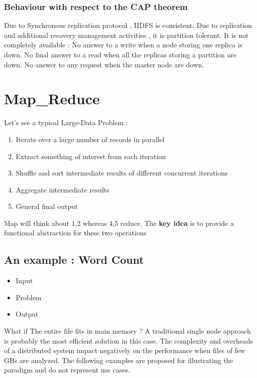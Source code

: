 \documentclass{article}
\begin{document}
\subsubsection{Behaviour with respect to the CAP theorem}
Due to Synchronous replication protocol , HDFS is consistent. Due to replication and additional recovery management activities , it is partition tolerant.
It is not completely available : No answer to a write when a node storing one replica is down. No final answer to a read when all the replicas storing a partition are down. No answer to any request when the master node are down.



\section{Map\_Reduce}
Let's see a typical Large-Data Problem : 
\begin{enumerate}
    \item Iterate over a large number of records in parallel
    \item Extract something of interest from each iteration
    \item Shuffle and sort intermediate results of different concurrent iterations
    \item Aggregate intermediate results
    \item General final output
\end{enumerate}
\vspace{3mm}
Map will think about 1,2 whereas 4,5 reduce.
The \textbf{key idea} is to provide a functional abstraction for these two operations

\subsection{An example : Word Count}
\begin{itemize}
    \item Input 
    \item Problem 
    \item Output 
\end{itemize}

\vspace{3mm}

What if The entire file fits in main memory ? A traditional single node approach is probably the most efficient solution in this case. The complexity and overheads of a distributed system impact negatively on the performance when files of few GBs are analyzed. The following examples are proposed for illustrating the paradigm and do not represent use cases.
\end{document}

